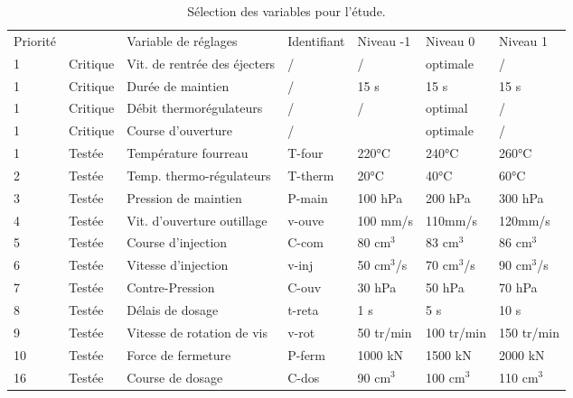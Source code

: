 \begin{table}[tbp]
	\centering
	\begin{tabular}{|l|l|l|l|l|l|l|}
		\arrayrulecolor{black}
		\hhline{-~-----}
		Priorité &          & Variable de réglages          & Identifiant & Niveau -1 & Niveau 0   & Niveau 1   \\ \hhline{=:-:=:=:=:=:=:} %
		1        & Critique & Vit. de rentrée des éjecters & /           & /         & optimale   & /          \\ \hline
		1        & Critique & Durée de maintien             & /           & 15 s      & 15 s       & 15 s       \\ \hline
		1        & Critique & Débit thermorégulateurs       & /           & /         & optimal    & /          \\ \hline
		1        & Critique & Course d'ouverture            & /           &           & optimale   & /          \\ \hline
		1        & Testée   & Température fourreau          & T-four      & 220°C     & 240°C      & 260°C      \\ \hline
		2        & Testée   & Temp. thermo-régulateurs      & T-therm     & 20°C      & 40°C       & 60°C       \\ \hline
		3        & Testée   & Pression de maintien          & P-main      & 100 hPa   & 200 hPa    & 300 hPa    \\ \hline
		4        & Testée   & Vit. d'ouverture outillage    & v-ouve      & 100 mm/s  & 110mm/s    & 120mm/s    \\ \hline
		5        & Testée   & Course d'injection            & C-com       & 80 cm$^3$ & 83 cm$^3$  & 86 cm$^3$     \\ \hline
		6        & Testée   & Vitesse d'injection           & v-inj    & 50 cm$^3$/s & 70 cm$^3$/s & 90 cm$^3$/s   \\ \hline
		7        & Testée   & Contre-Pression               & C-ouv       & 30 hPa    & 50 hPa     & 70 hPa     \\ \hline
		8        & Testée   & Délais de dosage              & t-reta      & 1 s       & 5 s        & 10 s       \\ \hline
		9        & Testée   & Vitesse de rotation de vis    & v-rot       & 50 tr/min & 100 tr/min & 150 tr/min \\ \hline
		10       & Testée   & Force de fermeture            & P-ferm      & 1000 kN   & 1500 kN    & 2000 kN    \\ \hline
		16       & Testée   & Course de dosage              & C-dos       & 90 cm$^3$ & 100 cm$^3$ & 110 cm$^3$    \\ \hline
	\end{tabular}
	\caption{Sélection des variables pour l'étude.}
	\label{tab:doe_choice}
\end{table}

